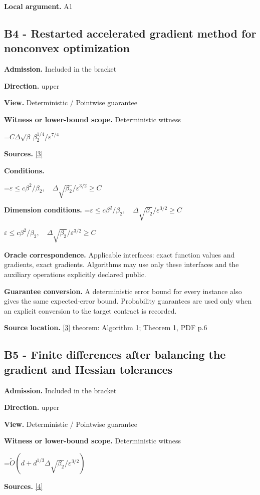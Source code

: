 \documentclass[10pt,a4paper]{article}
\newcommand{\AtlasMath}[1]{\par\begingroup\centering\setbox0=\hbox{$\displaystyle #1$}\ifdim\wd0>1.4\linewidth\typeout{ATLAS WIDE FORMULA: \the\wd0}\fi\ifdim\wd0>\linewidth\resizebox{\linewidth}{!}{\box0}\else\box0\fi\par\endgroup}
\newcommand{\AtlasInlineMath}[1]{\begingroup\setbox0=\hbox{$#1$}\ifdim\wd0>.4\linewidth\endgroup\AtlasMath{#1}\else\endgroup$#1$\fi}
\begin{document}
\textbf{Local argument.} A1

\subsection{B4 - Restarted accelerated gradient method for nonconvex optimization}
\textbf{Admission.} Included in the bracket

\textbf{Direction.} upper

\textbf{View.} Deterministic / Pointwise guarantee

\textbf{Witness or lower-bound scope.} Deterministic witness

\AtlasMath{C\Delta\sqrt\beta\,\beta_2^{1/4}/\varepsilon^{7/4}}
\textbf{Sources.} \href{https://jmlr.org/papers/volume24/22-0522/22-0522.pdf}{[3]}

\textbf{Conditions.} 
\AtlasMath{\varepsilon\le c\beta^2/\beta_2,\quad\Delta\sqrt{\beta_2}/\varepsilon^{3/2}\ge C}


\textbf{Dimension conditions.} \AtlasInlineMath{\varepsilon\le c\beta^2/\beta_2,\quad\Delta\sqrt{\beta_2}/\varepsilon^{3/2}\ge C}

\textbf{Oracle correspondence.} Applicable interfaces: exact function values and gradients, exact gradients. Algorithms may use only these interfaces and the auxiliary operations explicitly declared public.

\textbf{Guarantee conversion.} A deterministic error bound for every instance also gives the same expected-error bound. Probability guarantees are used only when an explicit conversion to the target contract is recorded.

\textbf{Source location.} \href{https://jmlr.org/papers/volume24/22-0522/22-0522.pdf}{[3]} theorem: Algorithm 1; Theorem 1, PDF p.6

\subsection{B5 - Finite differences after balancing the gradient and Hessian tolerances}
\textbf{Admission.} Included in the bracket

\textbf{Direction.} upper

\textbf{View.} Deterministic / Pointwise guarantee

\textbf{Witness or lower-bound scope.} Deterministic witness

\AtlasMath{\widetilde{O}(d+d^{1/3}\Delta\sqrt{\beta_2}/\varepsilon^{3/2})}
\textbf{Sources.} \href{https://arxiv.org/pdf/2510.20786}{[4]}
\end{document}
